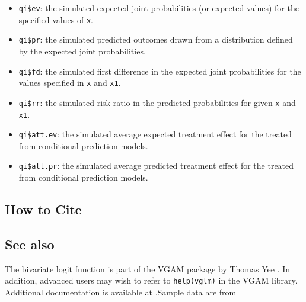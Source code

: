 \begin{itemize}
   \begin{itemize}
   \item {\tt qi\$ev}: the simulated expected joint probabilities (or expected
     values) for the specified values of {\tt x}.  
   \item {\tt qi\$pr}: the simulated predicted outcomes drawn from a
     distribution defined by the expected joint probabilities.
   \item {\tt qi\$fd}: the simulated first difference in the
     expected joint probabilities for the values specified in {\tt x} and
     {\tt x1}.
   \item {\tt qi\$rr}: the simulated risk ratio in the predicted
     probabilities for given {\tt x} and {\tt x1}.
   \item {\tt qi\$att.ev}: the simulated average expected treatment
     effect for the treated from conditional prediction models.  
   \item {\tt qi\$att.pr}: the simulated average predicted treatment
     effect for the treated from conditional prediction models.  
   \end{itemize}
\end{itemize}

\subsection*{How to Cite}


\subsection*{See also}
The bivariate logit function is part of the VGAM package by Thomas Yee \citep{YeeHas03}. In addition, advanced users may wish to refer to \texttt{help(vglm)} 
in the VGAM library.  Additional documentation is available at
.Sample data are from \cite{Martin92}
